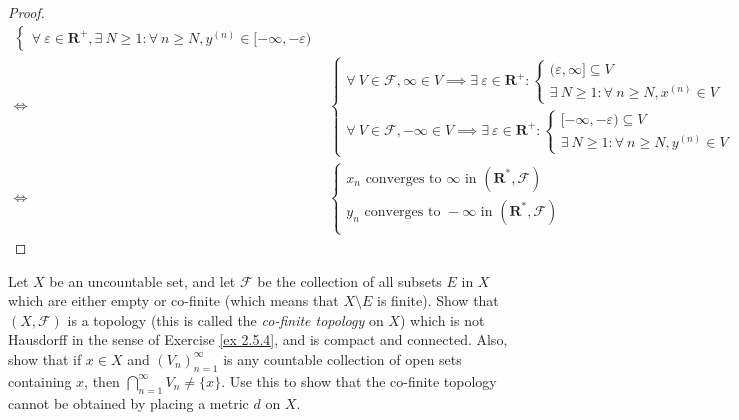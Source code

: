 \begin{proof}
\begin{align*}
\begin{cases}
            \forall\ \varepsilon \in \mathbf{R}^+, \exists\ N \geq 1 : \forall\ n \geq N, y^{(n)} \in [-\infty, -\varepsilon)
        \end{cases}  \\
        \iff & \begin{cases}
            \forall\ V \in \mathcal{F}, \infty \in V \implies \exists\ \varepsilon \in \mathbf{R}^+ : \begin{cases}
                (\varepsilon, \infty] \subseteq V \\
                \exists\ N \geq 1 : \forall\ n \geq N, x^{(n)} \in V
            \end{cases} \\
            \forall\ V \in \mathcal{F}, -\infty \in V \implies \exists\ \varepsilon \in \mathbf{R}^+ : \begin{cases}
                [-\infty, -\varepsilon) \subseteq V \\
                \exists\ N \geq 1 : \forall\ n \geq N, y^{(n)} \in V
            \end{cases}
        \end{cases} \\
        \iff & \begin{cases}
            x_n \text{ converges to } \infty \text{ in } (\mathbf{R}^*, \mathcal{F})  \\
            y_n \text{ converges to } -\infty \text{ in } (\mathbf{R}^*, \mathcal{F}) \\
        \end{cases}
    \end{align*}
\end{proof}

\begin{exercise}\label{ex 2.5.6}
    Let \(X\) be an uncountable set, and let \(\mathcal{F}\) be the collection of all subsets \(E\) in \(X\) which are either empty or co-finite (which means that \(X \setminus E\) is finite).
    Show that \((X, \mathcal{F})\) is a topology (this is called the \emph{co-finite topology} on \(X\)) which is not Hausdorff in the sense of Exercise \ref{ex 2.5.4}, and is compact and connected.
    Also, show that if \(x \in X\) and \((V_n)_{n = 1}^\infty\) is any countable collection of open sets containing \(x\), then \(\bigcap_{n = 1}^\infty V_n \neq \{x\}\).
    Use this to show that the co-finite topology cannot be obtained by placing a metric \(d\) on \(X\).
\end{exercise}

